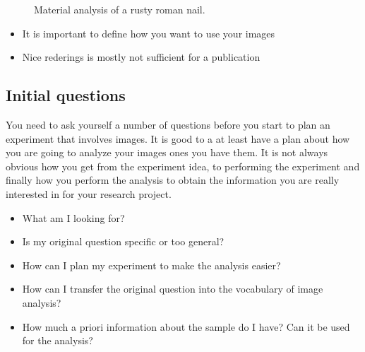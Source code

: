 \documentclass[letterpaper,10pt,english]{sphinxmanual}
\begin{document}
\begin{figure}[htbp]
\centering
\capstart

\noindent{}
\caption{Material analysis of a rusty roman nail.}\label{\detokenize{01-Introduction:id20}}\end{figure}
\begin{itemize}
\item {} 
\sphinxAtStartPar
It is important to define how you want to use your images

\item {} 
\sphinxAtStartPar
Nice rederings is mostly not sufficient for a publication

\end{itemize}




\subsection{Initial questions}
\label{\detokenize{01-Introduction:initial-questions}}
\sphinxAtStartPar
You need to ask yourself a number of questions before you start to plan an experiment that involves images. It is good to a at least have a plan about how you are going to analyze your images ones you have them. It is not always obvious how you get from the experiment idea, to performing the experiment and finally how you perform the analysis to obtain the information you are really interested in for your research project.
\begin{itemize}
\item {} 
\sphinxAtStartPar
What am I looking for?

\item {} 
\sphinxAtStartPar
Is my original question specific or too general?

\item {} 
\sphinxAtStartPar
How can I plan my experiment to make the analysis easier?

\item {} 
\sphinxAtStartPar
How can I transfer the original question into the vocabulary of image analysis?

\item {} 
\sphinxAtStartPar
How much a priori information about the sample do I have? Can it be used for the analysis?

\end{itemize}

\sphinxAtStartPar
\end{document}
